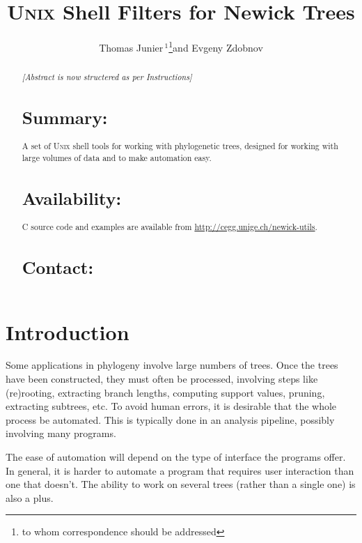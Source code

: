 \documentclass{article}
\newcommand{\unix}{\textsc{Unix}}
\begin{document}

\title{\unix{} Shell Filters for Newick Trees}
\author[Junier and Zdobnov]{Thomas Junier\,$^{1}$\footnote{to whom correspondence should be addressed}\hspace{1em}and Evgeny Zdobnov}




\maketitle

\begin{abstract}
\emph{[Abstract is now structered as per Instructions]}
\section{Summary:}
A set of \unix{} shell tools for working with phylogenetic trees, designed for working with large volumes of data and to make automation easy.
\section{Availability:}
C source code and examples are available from \url{http://cegg.unige.ch/newick-utils}.
\section{Contact:}
\end{abstract}
 
\section{Introduction}

Some applications in phylogeny involve large numbers of trees. Once the trees have been constructed, they must often be processed, involving steps like (re)rooting, extracting branch lengths, computing support values, pruning, extracting subtrees, etc. To avoid human errors, it is desirable that the whole process  be automated. This is typically done in an analysis pipeline, possibly involving many programs.

The ease of automation will depend on the type of interface the programs offer. In general, it is harder to automate a program that requires user interaction than one that doesn't. The ability to work on several trees (rather than a single one) is also a plus.
\end{document}

